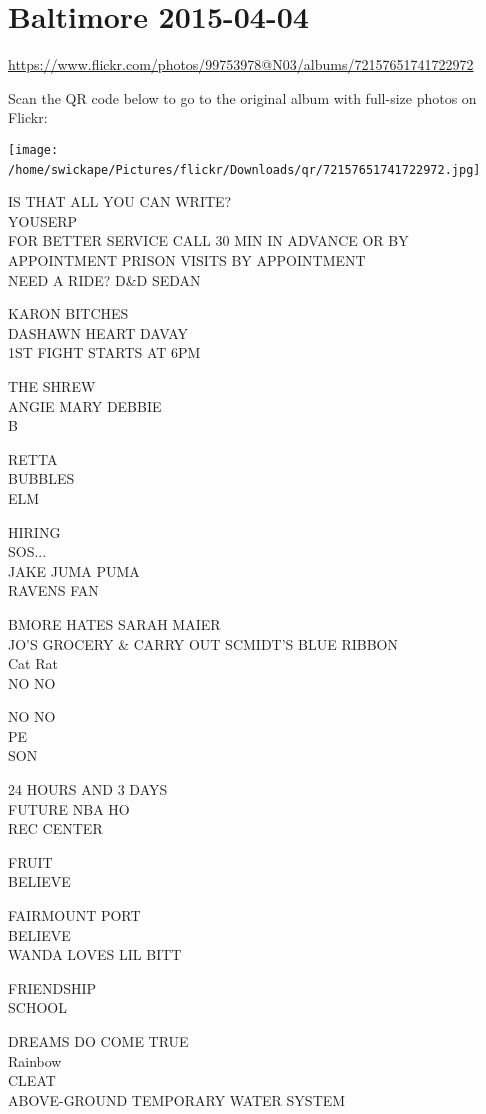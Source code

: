 \documentclass[10pt,letterpaper]{article}
\begin{document}
\section*{Baltimore 2015-04-04}

\url{https://www.flickr.com/photos/99753978@N03/albums/72157651741722972}

Scan the QR code below to go to the original album with full-size photos on Flickr:

\texttt{[image: /home/swickape/Pictures/flickr/Downloads/qr/72157651741722972.jpg]}
\

IS THAT ALL YOU CAN WRITE?\\
YOUSERP\\
FOR BETTER SERVICE CALL 30 MIN IN ADVANCE OR BY APPOINTMENT PRISON VISITS BY APPOINTMENT\\
NEED A RIDE?  D\&D SEDAN

KARON BITCHES\\
DASHAWN HEART DAVAY\\
1ST FIGHT STARTS AT 6PM

THE SHREW\\
ANGIE MARY DEBBIE\\
B

RETTA\\
BUBBLES\\
ELM

HIRING\\
SOS...\\
JAKE JUMA PUMA\\
RAVENS FAN

BMORE HATES SARAH MAIER\\
JO'S GROCERY \& CARRY OUT SCMIDT'S BLUE RIBBON\\
Cat Rat\\
NO NO

NO NO\\
PE\\
SON

24 HOURS AND 3 DAYS\\
FUTURE NBA HO\\
REC CENTER

FRUIT\\
BELIEVE

FAIRMOUNT PORT\\
BELIEVE\\
WANDA LOVES LIL BITT

FRIENDSHIP\\
SCHOOL

DREAMS DO COME TRUE\\
Rainbow\\
CLEAT\\
ABOVE{-}GROUND TEMPORARY WATER SYSTEM
\end{document}
